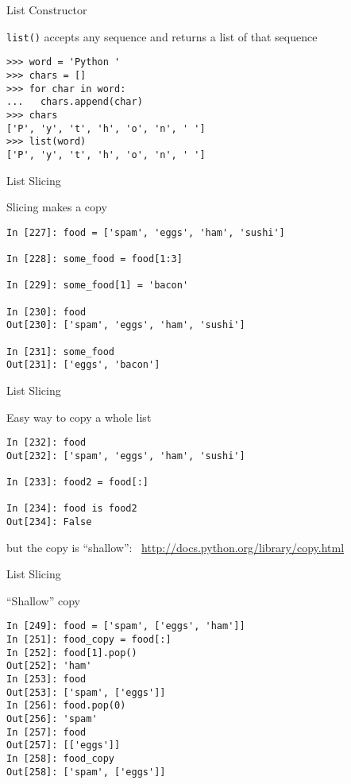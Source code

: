 \documentclass{beamer}
\begin{document}
\begin{frame}[fragile]{List Constructor}

{\large \verb|list()| accepts any sequence and returns a list of that sequence}
\begin{verbatim}
>>> word = 'Python '
>>> chars = []
>>> for char in word:
...   chars.append(char)
>>> chars
['P', 'y', 't', 'h', 'o', 'n', ' ']
>>> list(word)
['P', 'y', 't', 'h', 'o', 'n', ' ']
\end{verbatim}
\end{frame} 



\begin{frame}[fragile]{List Slicing}

{\large Slicing makes a copy}

\begin{verbatim}
In [227]: food = ['spam', 'eggs', 'ham', 'sushi']

In [228]: some_food = food[1:3]

In [229]: some_food[1] = 'bacon'

In [230]: food
Out[230]: ['spam', 'eggs', 'ham', 'sushi']

In [231]: some_food
Out[231]: ['eggs', 'bacon']
\end{verbatim}

\end{frame}


\begin{frame}[fragile]{List Slicing}

{\large Easy way to copy a whole list}

\begin{verbatim}
In [232]: food
Out[232]: ['spam', 'eggs', 'ham', 'sushi']

In [233]: food2 = food[:]

In [234]: food is food2
Out[234]: False

\end{verbatim}

{\Large but the copy is ``shallow''}: \
\url{http://docs.python.org/library/copy.html}

\end{frame} 

\begin{frame}[fragile]{List Slicing}

{\Large ``Shallow'' copy}

\begin{verbatim}
In [249]: food = ['spam', ['eggs', 'ham']]
In [251]: food_copy = food[:]
In [252]: food[1].pop()
Out[252]: 'ham'
In [253]: food
Out[253]: ['spam', ['eggs']]
In [256]: food.pop(0)
Out[256]: 'spam'
In [257]: food
Out[257]: [['eggs']]
In [258]: food_copy
Out[258]: ['spam', ['eggs']]
\end{verbatim}

\end{frame} 
\end{document}
